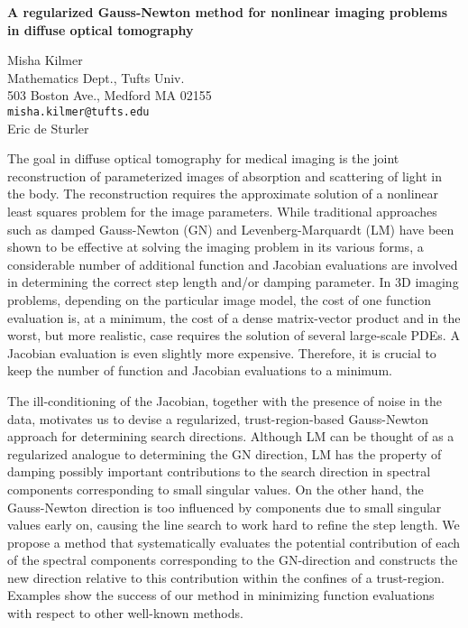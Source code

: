 \documentclass[twosided]{report}
\begin{document}
\begin{center}
{\large			%
{\bf A regularized Gauss-Newton method for nonlinear imaging problems \\
	in diffuse optical tomography}}

	Misha Kilmer \\
	Mathematics Dept., Tufts Univ. \\
	503 Boston Ave.,  Medford MA 02155 \\
	{\tt misha.kilmer@tufts.edu} \\
	Eric de Sturler
\end{center}
The goal in diffuse optical tomography for medical imaging
is the joint reconstruction of parameterized images of
absorption and scattering of light in the body. The
reconstruction requires the approximate solution of a
nonlinear least squares problem for the image parameters.
While traditional approaches such as damped Gauss-Newton
(GN) and Levenberg-Marquardt (LM) have been shown to be
effective at solving the imaging problem in its various
forms, a considerable number of additional function and
Jacobian evaluations are involved in determining the correct
step length and/or damping parameter. In 3D imaging
problems, depending on the particular image model, the cost
of one function evaluation is, at a minimum, the cost of a
dense matrix-vector product and in the worst, but more
realistic, case requires the solution of several large-scale
PDEs. A Jacobian evaluation is even slightly more
expensive. Therefore, it is crucial to keep the number of
function and Jacobian evaluations to a minimum.

The
ill-conditioning of the Jacobian, together with the presence
of noise in the data, motivates us to devise a regularized,
trust-region-based Gauss-Newton approach for determining
search directions. Although LM can be thought of as a
regularized analogue to determining the GN direction, LM has
the property of damping possibly important contributions to
the search direction in spectral components corresponding to
small singular values. On the other hand, the Gauss-Newton
direction is too influenced by components due to small
singular values early on, causing the line search to work
hard to refine the step length. We propose a method that
systematically evaluates the potential contribution of each
of the spectral components corresponding to the GN-direction
and constructs the new direction relative to this
contribution within the confines of a trust-region. Examples
show the success of our method in minimizing function
evaluations with respect to other well-known methods.
\end{document}
